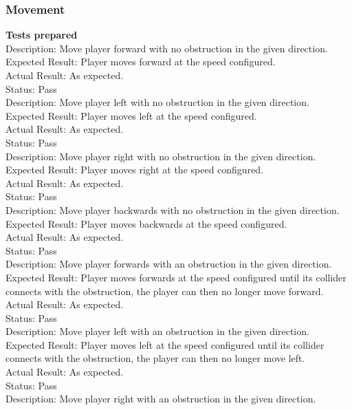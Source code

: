 \documentclass[11pt,a4paper]{article}
\begin{document}
\subsubsection{Movement}
\textbf{Tests prepared}\\
Description: Move player forward with no obstruction in the given direction.\\
Expected Result: Player moves forward at the speed configured.\\
Actual Result: As expected.\\
Status: Pass
\smallskip\\
Description: Move player left with no obstruction in the given direction.\\
Expected Result: Player moves left at the speed configured.\\
Actual Result: As expected.\\
Status: Pass
\smallskip\\
Description: Move player right with no obstruction in the given direction.\\
Expected Result: Player moves right at the speed configured.\\
Actual Result: As expected.\\
Status: Pass
\smallskip\\
Description: Move player backwards with no obstruction in the given direction.\\
Expected Result: Player moves backwards at the speed configured.\\
Actual Result: As expected.\\
Status: Pass
\smallskip\\
Description: Move player forwards with an obstruction in the given direction.\\
Expected Result: Player moves forwards at the speed configured until its collider connects with the obstruction, the player can then no longer move forward.\\
Actual Result: As expected.\\
Status: Pass
\smallskip\\
Description: Move player left with an obstruction in the given direction.\\
Expected Result: Player moves left at the speed configured until its collider connects with the obstruction, the player can then no longer move left.\\
Actual Result: As expected.\\
Status: Pass
\smallskip\\
Description: Move player right with an obstruction in the given direction.\\
\end{document}
